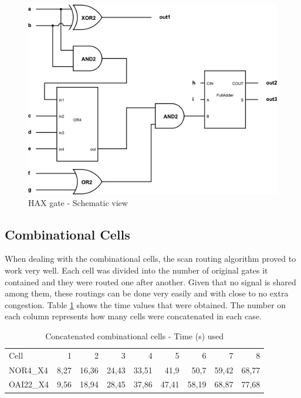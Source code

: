 \begin{figure}[h!]
  \centering
  \includegraphics[scale=0.3]{img/results/hax_schematic.png}
  \caption{HAX gate - Schematic view}
  \label{fig:hax_schematic}
\end{figure} 


\subsection{Combinational Cells}

When dealing with the combinational cells, the scan routing algorithm proved to work very well. Each cell was divided into the number of original gates it contained and they were routed one after another. Given that no signal is shared among them, these routings can be done very easily and with close to no extra congestion. Table \ref{tab:goodcombinatiornal} shows the time values that were obtained. The number on each column represents how many cells were concatenated in each case. \\

\begin{table}
\centering
\begin{tabular}{|l|r|r|r|r|r|r|r|r|}
\cline{1-9}
Cell & 1 & 2 & 3 & 4 & 5 & 6 & 7 & 8\\ \cline{1-9}
NOR4\_X4 & 8,27 & 16,36 & 24,43 & 33,51 & 41,9 & 50,7 & 59,42 & 68,77\\ \hline
OAI22\_X4 & 9,56 & 18,94 & 28,45 & 37,86 & 47,41 & 58,19 & 68,87 & 77,68 \\\cline{1-9}
\end{tabular} 
\caption{Concatenated combinational cells - Time (s) used}
\label{tab:goodcombinatiornal}
\end{table}

